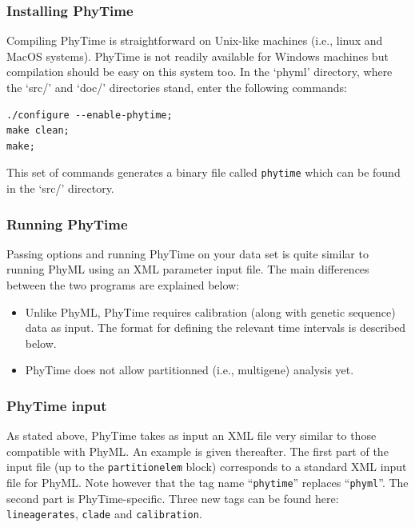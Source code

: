 \documentclass[a4paper,12pt]{article}
\newcommand{\x}[1]{\texttt{#1}}
\begin{document}
\subsubsection{Installing PhyTime}

Compiling PhyTime is straightforward on Unix-like  machines (i.e., linux and MacOS systems). PhyTime
is not readily available for Windows machines but  compilation should be easy on this system too. In
the `phyml' directory, where the `src/'  and `doc/' directories stand, enter the following commands:
{\setlength{\baselineskip}{0.5\baselineskip}
\begin{verbatim}
./configure --enable-phytime;
make clean;
make;
\end{verbatim} } This set of commands generates  a binary file called \x{phytime} which can be found
  in the `src/' directory.

\subsubsection{Running  PhyTime} Passing  options and  running  PhyTime on  your data  set is  quite
similar to running  PhyML using an XML parameter input file.  The main differences between the  two programs are
explained below:
\begin{itemize}
\item Unlike PhyML, PhyTime requires calibration (along with genetic sequence) data as input. The format for
  defining the relevant time intervals is described below.
\item  PhyTime does not allow partitionned (i.e., multigene) analysis yet.
\end{itemize}

\subsubsection{PhyTime input}
As stated above, PhyTime takes as input an XML file very similar to those compatible with PhyML. An
example is given thereafter. The first part of the input file (up to the \x{partitionelem} block) corresponds to a standard XML input
file for PhyML. Note however that the tag name ``\x{phytime}'' replaces ``\x{phyml}''. The second
part is PhyTime-specific. Three new tags can be found here: \x{lineagerates}, \x{clade}
and \x{calibration}. 
\end{document}
